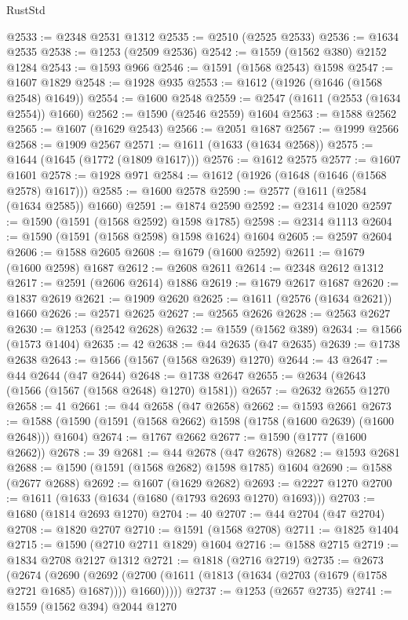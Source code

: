 \begin{lexlean}{RustStd}
\begin{coremodule}
@2533 := @2348 @2531 @1312
@2535 := @2510 (@2525 @2533)
@2536 := @1634 @2535
@2538 := @1253 (@2509 @2536)
@2542 := @1559 (@1562 @380) @2152 @1284
@2543 := @1593 @966
@2546 := @1591 (@1568 @2543) @1598
@2547 := @1607 @1829
@2548 := @1928 @935
@2553 := @1612 (@1926 (@1646 (@1568 @2548) @1649))
@2554 := @1600 @2548
@2559 := @2547 (@1611 (@2553 (@1634 @2554)) @1660)
@2562 := @1590 (@2546 @2559) @1604
@2563 := @1588 @2562
@2565 := @1607 (@1629 @2543)
@2566 := @2051 @1687
@2567 := @1999 @2566
@2568 := @1909 @2567
@2571 := @1611 (@1633 (@1634 @2568))
@2575 := @1644 (@1645 (@1772 (@1809 @1617)))
@2576 := @1612 @2575
@2577 := @1607 @1601
@2578 := @1928 @971
@2584 := @1612 (@1926 (@1648 (@1646 (@1568 @2578) @1617)))
@2585 := @1600 @2578
@2590 := @2577 (@1611 (@2584 (@1634 @2585)) @1660)
@2591 := @1874 @2590
@2592 := @2314 @1020
@2597 := @1590 (@1591 (@1568 @2592) @1598 @1785)
@2598 := @2314 @1113
@2604 := @1590 (@1591 (@1568 @2598) @1598 @1624) @1604
@2605 := @2597 @2604
@2606 := @1588 @2605
@2608 := @1679 (@1600 @2592)
@2611 := @1679 (@1600 @2598) @1687
@2612 := @2608 @2611
@2614 := @2348 @2612 @1312
@2617 := @2591 (@2606 @2614) @1886
@2619 := @1679 @2617 @1687
@2620 := @1837 @2619
@2621 := @1909 @2620
@2625 := @1611 (@2576 (@1634 @2621)) @1660
@2626 := @2571 @2625
@2627 := @2565 @2626
@2628 := @2563 @2627
@2630 := @1253 (@2542 @2628)
@2632 := @1559 (@1562 @389)
@2634 := @1566 (@1573 @1404)
@2635 := 42
@2638 := @44 @2635 (@47 @2635)
@2639 := @1738 @2638
@2643 := @1566 (@1567 (@1568 @2639) @1270)
@2644 := 43
@2647 := @44 @2644 (@47 @2644)
@2648 := @1738 @2647
@2655 := @2634 (@2643 (@1566 (@1567 (@1568 @2648) @1270) @1581))
@2657 := @2632 @2655 @1270
@2658 := 41
@2661 := @44 @2658 (@47 @2658)
@2662 := @1593 @2661
@2673 := @1588 (@1590 (@1591 (@1568 @2662) @1598 (@1758 (@1600 @2639) (@1600 @2648))) @1604)
@2674 := @1767 @2662
@2677 := @1590 (@1777 (@1600 @2662))
@2678 := 39
@2681 := @44 @2678 (@47 @2678)
@2682 := @1593 @2681
@2688 := @1590 (@1591 (@1568 @2682) @1598 @1785) @1604
@2690 := @1588 (@2677 @2688)
@2692 := @1607 (@1629 @2682)
@2693 := @2227 @1270
@2700 := @1611 (@1633 (@1634 (@1680 (@1793 @2693 @1270) @1693)))
@2703 := @1680 (@1814 @2693 @1270)
@2704 := 40
@2707 := @44 @2704 (@47 @2704)
@2708 := @1820 @2707
@2710 := @1591 (@1568 @2708)
@2711 := @1825 @1404
@2715 := @1590 (@2710 @2711 @1829) @1604
@2716 := @1588 @2715
@2719 := @1834 @2708 @2127 @1312
@2721 := @1818 (@2716 @2719)
@2735 := @2673
    (@2674
      (@2690
        (@2692 (@2700 (@1611 (@1813 (@1634 (@2703 (@1679 (@1758 @2721 @1685) @1687)))) @1660)))))
@2737 := @1253 (@2657 @2735)
@2741 := @1559 (@1562 @394) @2044 @1270

\end{coremodule}
\end{lexlean}

